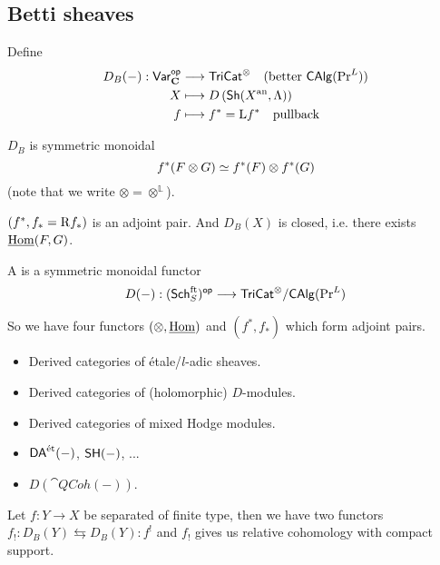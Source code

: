 \subsection{Betti sheaves}
\begin{definition}
Define
\begin{align*}
D_B(-): \mathsf{Var}_{\mathbf{C}}^\mathsf{op} &\longrightarrow \mathsf{TriCat}^{\otimes}\quad (\text{better
}\mathsf{CAlg}(\operatorname{Pr}^L)) \\
X &\longmapsto D\left( \mathsf{Sh}(X^\text{an},\Lambda) \right) \\
f &\longmapsto f^{*} = \mathrm{L} f^{*}\quad \text{pullback}
\end{align*}
\end{definition}
$D_B$ is symmetric monoidal
\[
f^{*}(F\otimes G) \simeq f^{*}(F)\otimes f^{*}(G)
\] %
(note that we write $\otimes = \otimes^{\mathbb{L}}$).
\begin{proposition}
$(f^{*},f_*=\mathrm{R} f_*)$ is an adjoint pair. And $D_B(X)$ is closed, i.e. there exists $\underline{\operatorname{Hom}}(F,G)$.
\end{proposition}
\begin{definition}
A  is a symmetric monoidal functor
\[
D(-):(\Sch_S^{\text{ft}})\op \to \cat{TriCat}^{\otimes} / \cat{CAlg}(\PrL)
\]
\end{definition}
So we have four functors $(\otimes,\underline{\operatorname{Hom}})$ and $(f^{*},f_*)$ which form adjoint pairs.
\begin{example}\leavevmode
\begin{itemize}
\item Derived categories of \'etale/$l$-adic sheaves.
\item Derived categories of (holomorphic) $D$-modules.
\item Derived categories of mixed Hodge modules.
\item $\mathsf{DA}^\text{\'et}(-)$, $\mathsf{SH}(-)$, ...
\item $D(\cat{QCoh}(-))$.
\end{itemize}
\end{example}
Let $f:Y\to X$ be separated of finite type, then we have two functors
$f_!:D_B(Y)\leftrightarrows D_B(Y):f^{!}$ and $f_!$ gives us relative cohomology with
compact support.

